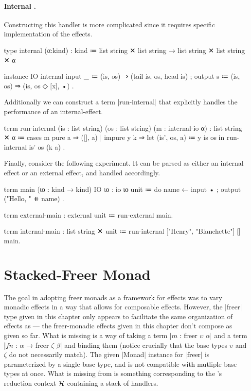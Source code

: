 \paragraph{Internal \IO.}
%
Constructing this handler is more complicated since it requires specific implementation of the effects.
\begin{program}
%
type internal (α:kind) : kind
  ≔ list string ✕ list string → list string ✕ list string ✕ α

instance IO internal
  { input  _ ≔ (is, os) ⇒ (tail is, os, head is)
  ; output s ≔ (is, os) ⇒ (is, os ◇ [x], •) }.
\end{program}
%
Additionally we can construct a term \code|run-internal| that explicitly handles the performance of an internal-\IO effect.
%
\begin{program}
term run-internal (is : list string) (os : list string)
        (m : internal-io α)
  : list string ✕ α
  ≔ cases m
      { pure   a   ⇒ ([], a)
      | impure y k ⇒ let (is', os, a) ≔ y is os in
                     run-internal is' os (k a) }.
\end{program}

\newpage
Finally, consider the following experiment.
It can be parsed as either an internal \IO effect or an external \IO effect, and handled accordingly.
%
\begin{snippet}
term main (ιο : kind → kind) {IO ιο} : io ιο unit
  ≔ do
      { name ← input •
      ; output ("Hello, " ⧺ name) }.

term external-main : external unit ≔ run-external main.

term internal-main : list string ✕ unit
  ≔ run-internal ["Henry", "Blanchette"] [] main.
\end{snippet}

\section{Stacked-Freer Monad}

The goal in adopting freer monads as a framework for effects was to vary monadic effects in a way that allows for composable effects.
However, the \code|freer| type given in this chapter only appears to facilitate the same organization of effects as \LangC --- the freer-monadic effects given in this chapter don't compose as given so far.
What is missing is a way of taking a term \code|$m$ : freer $υ$ $α$| and a term \code|$fn$ : $α$ → freer $ζ$ $β$| and binding them (notice crucially that the base types $υ$ and $ζ$ do not necessarily match).
The given \code|Monad| instance for \code|freer| is parameterized by a single base type, and is not compatible with mutliple base types at once.
What is missing from \LangE is something corresponding to the \LangD's reduction context $\mathcal{H}$ containing a stack of handlers.

